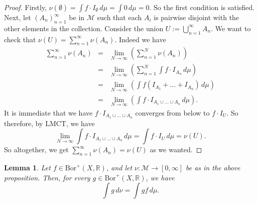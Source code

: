 \documentclass[letterpaper, 12pt]{article}
\newcommand{\cM}{\mathcal{M}}
\newcommand{\bR}{\mathbb{R}}
\newcommand{\Bor}{\mathrm{Bor}}
\providecommand{\mbrac}[1] {\left( #1 \right)}
\theoremstyle{stdthm}
\newtheorem{lem}[thm]{Lemma}
\theoremstyle{stddef}
\theoremstyle{stdnonum}
\theoremstyle{stdqands}
\theoremstyle{stdbold}
\begin{document}
\begin{proof}
Firstly, $\nu(\emptyset) = \int f \cdot I_\emptyset \, d\mu = \int 0 \, d\mu = 0$. So the first condition is satisfied. Next, let $(A_n)_{n=1}^\infty$ be in $\cM$ such that each $A_i$ is pairwise disjoint with the other elements in the collection. Consider the union $U:= \bigcup_{n=1}^\infty A_n$. We want to check that $\nu(U) = \sum_{n=1}^\infty \nu(A_n)$. Indeed we have
\begin{eqnarray*}
\sum_{n=1}^\infty \nu(A_n) &=& \lim_{N\rightarrow \infty} \mbrac{\sum_{n=1}^N \nu(A_n)}\\
&=& \lim_{N\rightarrow \infty} \mbrac{\sum_{n=1}^N \int f \cdot I_{A_n} \, d\mu } \\
&=& \lim_{N\rightarrow \infty} \mbrac{\int f(I_{A_1} + \dots + I_{A_n})\, d\mu }\\
&=& \lim_{N \rightarrow \infty} \mbrac{ \int f \cdot I_{A_1 \cup \dots \cup A_n} \, d\mu}.
\end{eqnarray*}
It is immediate that we have $f\cdot I_{A_1 \cup \dots \cup A_n}$ converges from below to $f \cdot I_U$. So therefore, by LMCT, we have  
\[ \lim_{N\rightarrow \infty} \int f \cdot I_{A_1\cup \dots \cup A_n} \, d\mu = \int f \cdot I_U \, d\mu = \nu(U).\] 
So altogether, we get $\sum_{n=1}^\infty \nu(A_n) = \nu(U)$ as we wanted. 
\end{proof}

\begin{lem}
Let $f \in \Bor^+(X,\bR)$, and let $\nu: \cM \rightarrow [0,\infty]$ be as in the above proposition. Then, for every $g \in \Bor^+(X,\bR)$, we have 
\[\int g \, d\nu = \int gf \, d\mu. \tag{$\diamond$} \]
\end{lem}
\end{document}
